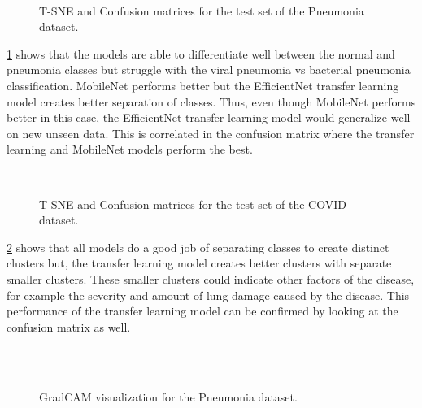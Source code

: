 \documentclass[10pt,twocolumn,letterpaper]{article}
\begin{document}
\begin{figure}
  \\
  \caption{T-SNE and Confusion matrices for the test set of the Pneumonia dataset.}
  \label{fig:tsne_pneumonia}
\end{figure}


\cref{fig:tsne_pneumonia} shows that the models are able to differentiate well between the normal and pneumonia 
classes but struggle with the viral pneumonia vs bacterial pneumonia classification. MobileNet performs better 
but the EfficientNet transfer learning model creates better separation of classes. Thus, even though 
MobileNet performs better in this case, 
the EfficientNet transfer learning model would generalize well on new unseen data. This is correlated in 
the confusion matrix where the transfer learning and MobileNet models perform the best.

\begin{figure}
  \\
  \caption{T-SNE and Confusion matrices for the test set of the COVID dataset.}
  \label{fig:tsne_covid}
\end{figure}

\cref{fig:tsne_covid} shows that all models do a good job of separating classes to create distinct clusters 
but, the transfer learning model creates better clusters with separate smaller clusters. These smaller 
clusters could indicate other factors of the disease, for example the severity and amount of lung damage caused 
by the disease. This performance of the transfer learning model can be confirmed by looking at the confusion 
matrix as well.



\begin{figure}
  \\
  \\
  \caption{GradCAM visualization for the Pneumonia dataset.}
  \label{fig:gradcam_pneumonia}
\end{figure}
\end{document}
